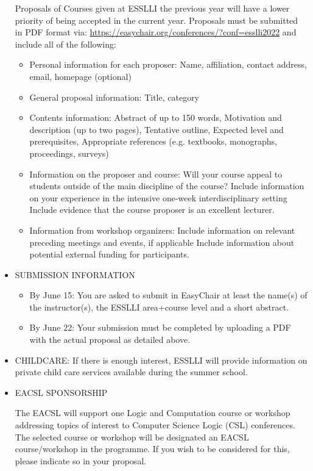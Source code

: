 \documentclass[prodmode,acmtecs]{acmsmall} %
\begin{document}
\begin{itemize}
  Proposals of Courses given at ESSLLI the previous year will have a lower priority of being accepted in the current year. Proposals must be submitted in PDF format via: \href{https://easychair.org/conferences/?conf=esslli2022}{https://easychair.org/conferences/?conf=esslli2022} and include all of the following: 
 
\begin{itemize}\item  Personal information for each proposer: Name, affiliation, contact address, email, homepage (optional)
\item  General proposal information: Title, category
\item  Contents information: Abstract of up to 150 words, Motivation and description (up to two pages), Tentative outline, Expected level and prerequisites, Appropriate references (e.g. textbooks, monographs, proceedings, surveys)
\item  Information on the proposer and course: Will your course appeal to students outside of the main discipline of the course? Include information on your experience in the intensive one-week interdisciplinary setting Include evidence that the course proposer is an excellent lecturer.
\item  Information from workshop organizers: Include information on relevant preceding meetings and events, if  applicable Include information about potential external funding for participants.
\end{itemize} 
\item  SUBMISSION INFORMATION  
 
\begin{itemize}\item  By June 15: You are asked to submit in EasyChair at least the name(s) of the instructor(s),  the ESSLLI area+course level and a short abstract.
\item  By June 22: Your submission must be completed by uploading a PDF with the actual proposal  as detailed above.
\end{itemize} 
\item  CHILDCARE:  If there is enough interest, ESSLLI will provide information on private child care services available during the summer school. 
 
\item  EACSL SPONSORSHIP  
 
  The EACSL will support one Logic and Computation course or workshop addressing topics of interest to Computer Science Logic (CSL) conferences. The selected course or workshop will be designated an EACSL course/workshop in the programme. If you wish to be considered for this, please indicate so in your proposal. 
 

\end{itemize}
\end{document}
